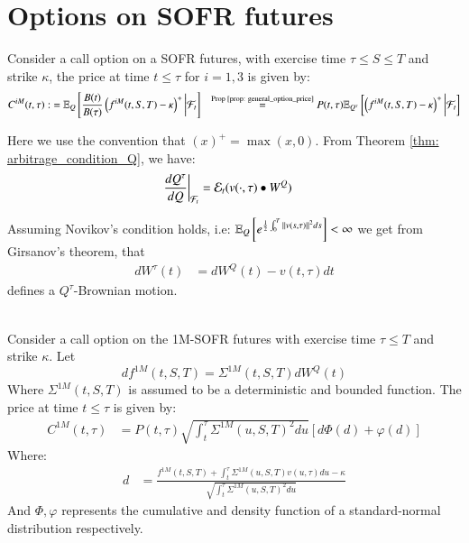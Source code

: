 \newpage 

\section{Options on SOFR futures}

Consider a call option on a SOFR futures, with exercise time $\tau \leq S \leq T$ and strike $\kappa$, the price at time $t \leq \tau$ for $i=1,3$ is given by:
\begin{align*}
C^{iM}(t,\tau) :&= \mathbb{E}_{Q}\left[
\frac{B(t)}{B(\tau)}\left(
f^{iM}(t,S,T) - \kappa
\right)^{+}
\bigg{|}\mathcal{F}_{t}
\right]  
&\stackrel{\text{Prop \ref{prop: general_option_price}}}{=} 
P(t,\tau)\mathbb{E}_{Q^{\tau}}\left[
\left(f^{iM}(t,S,T) - \kappa
\right)^{+}
\bigg{|}\mathcal{F}_{t}
\right]
\end{align*} 

Here we use the convention that $(x)^{+} = \max(x,0)$. From Theorem \ref{thm: arbitrage_condition_Q}, we have: 
\begin{align*}
\frac{dQ^{\tau}}{dQ}\bigg{|}_{\mathcal{F}_{t}} &= \mathcal{E}_{t}(v(\cdot, \tau)\bullet W^{Q})
\end{align*} 

Assuming Novikov's condition holds, i.e: $\mathbb{E}_{Q}\left[e^{\frac{1}{2}\int_{0}^{T}\norm{v(s,\tau)}^{2}ds}\right] < \infty$ we get from Girsanov's theorem, that
\begin{align*}
dW^{\tau}(t) &= dW^{Q}(t) - v(t,\tau)dt    
\end{align*}
defines a $Q^{\tau}$-Brownian motion. 
\\~\\ 
\begin{proposition}
Consider a call option on the 1M-SOFR futures with exercise time $\tau \leq T$ and strike $\kappa$. Let 
\[
df^{1M}(t,S,T) = \Sigma^{1M}(t,S,T)dW^{Q}(t)  
\]
Where $\Sigma^{1M}(t,S,T)$ is assumed to be a deterministic and bounded function. The price at time $t\leq \tau$ is given by: 
\begin{align*}
C^{1M}(t,\tau) &= 
P(t,\tau)\sqrt{
\int_{t}^{\tau}\Sigma^{1M}(u,S,T)^{2}du
}\left[
d\Phi(d) + \varphi(d)
\right]
\end{align*}
Where: 
\begin{align*}
d &= 
\frac{
f^{1M}(t,S,T) + \int_{t}^{\tau}\Sigma^{1M}(u,S,T)v(u,\tau)du - \kappa
}{
\sqrt{
\int_{t}^{\tau}\Sigma^{1M}(u,S,T)^{2}du
}
}
\end{align*}
And $\Phi, \varphi$ represents the cumulative and density function of a standard-normal distribution respectively. 
\end{proposition}

